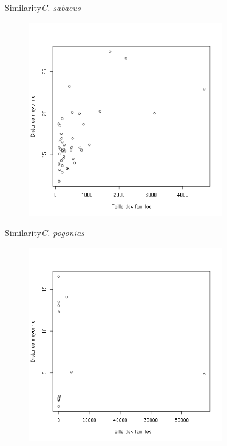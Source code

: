 \documentclass[11pt]{beamer}
\begin{document}
\begin{frame}{Similarity}{\textit{C. sabaeus}}
\begin{center}
	\begin{figure}
		\includegraphics[width=0.75\textwidth]{img/Csa_similarity_090.png}
	\end{figure}	
\end{center}
\end{frame}

\begin{frame}{Similarity}{\textit{C. pogonias}}
\begin{center}
	\begin{figure}
		\includegraphics[width=0.75\textwidth]{img/Cp_similarity_090.png}
	\end{figure}	
\end{center}
\end{frame}
\end{document}
